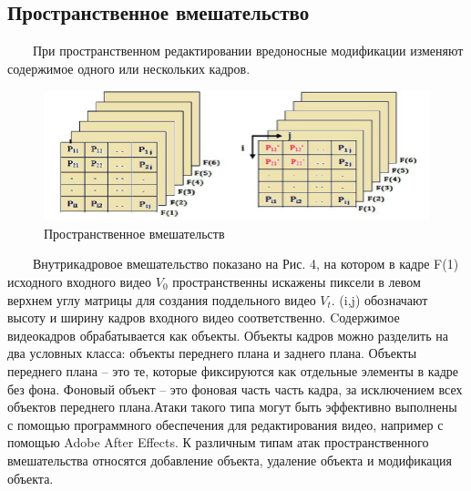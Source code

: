 \documentclass[12pt]{article}
\begin{document}
    \newpage
    \subsection{Пространственное вмешательство}
        $\qquad$При пространственном редактировании вредоносные модификации изменяют содержимое одного или нескольких кадров.
        \newline
        \begin{figure}[h!]
            \centering
            \includegraphics {4.jpg}
            \caption{Пространственное вмешательств}
        \end{figure}
        \newline
        $\qquad$Внутрикадровое вмешательство показано на Рис. 4, на котором в кадре F(1) исходного входного видео $V_0$ пространственны искажены пиксели в левом верхнем углу матрицы для создания поддельного видео $V_t$. (i,j) обозначают высоту и ширину кадров входного видео соответственно.
        \newline
        Cодержимое видеокадров обрабатывается как объекты. Объекты кадров можно разделить на два условных класса: объекты переднего плана и заднего плана. 
        \newline
        Объекты переднего плана – это те, которые фиксируются как отдельные элементы в кадре без фона. 
        \newline
        Фоновый объект – это фоновая часть часть кадра, за исключением всех объектов переднего плана.Атаки такого типа могут быть эффективно выполнены с помощью программного обеспечения для редактирования видео, например с помощью Adobe After Effects. К различным типам атак пространственного вмешательства относятся добавление объекта, удаление объекта и модификация объекта. 
\end{document}
